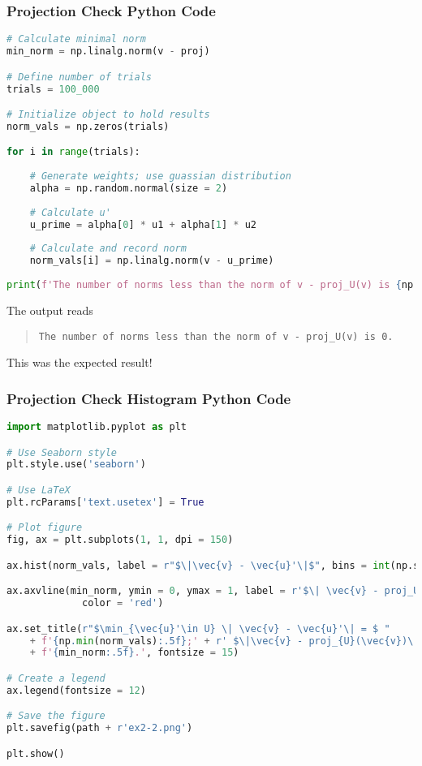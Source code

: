 \documentclass{beamer}
\begin{document}
\begin{frame}[fragile]
\frametitle{Projection Check Python Code}
\begin{lstlisting}[language=Python]
# Calculate minimal norm
min_norm = np.linalg.norm(v - proj)

# Define number of trials
trials = 100_000

# Initialize object to hold results
norm_vals = np.zeros(trials)

for i in range(trials):
    
    # Generate weights; use guassian distribution
    alpha = np.random.normal(size = 2)
    
    # Calculate u'
    u_prime = alpha[0] * u1 + alpha[1] * u2
    
    # Calculate and record norm
    norm_vals[i] = np.linalg.norm(v - u_prime)
    
print(f'The number of norms less than the norm of v - proj_U(v) is {np.sum(norm_vals < min_norm)}.')
\end{lstlisting}
The output reads
\begin{quote}
\small
\texttt{The number of norms less than the norm of v - proj\_U(v) is 0.}
\end{quote}
This was the expected result!
\end{frame}

\begin{frame}[fragile]
\frametitle{Projection Check Histogram Python Code}

\begin{lstlisting}[language=Python]
import matplotlib.pyplot as plt

# Use Seaborn style
plt.style.use('seaborn')

# Use LaTeX
plt.rcParams['text.usetex'] = True

# Plot figure
fig, ax = plt.subplots(1, 1, dpi = 150)

ax.hist(norm_vals, label = r"$\|\vec{v} - \vec{u}'\|$", bins = int(np.sqrt(trials)))

ax.axvline(min_norm, ymin = 0, ymax = 1, label = r'$\| \vec{v} - proj_U(\vec{v})\|$', 
             color = 'red')

ax.set_title(r"$\min_{\vec{u}'\in U} \| \vec{v} - \vec{u}'\| = $ " 
	+ f'{np.min(norm_vals):.5f};' + r' $\|\vec{v} - proj_{U}(\vec{v})\| = $ ' 
	+ f'{min_norm:.5f}.', fontsize = 15)

# Create a legend
ax.legend(fontsize = 12)

# Save the figure
plt.savefig(path + r'ex2-2.png')

plt.show()
\end{lstlisting}
\end{frame}
\end{document}
